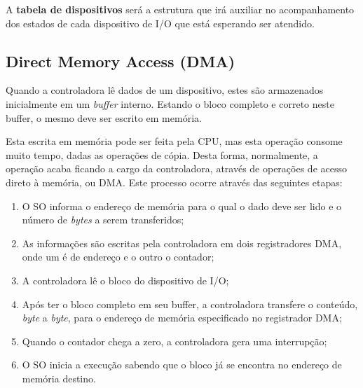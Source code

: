 A \textbf{tabela de dispositivos} será a estrutura que irá auxiliar no acompanhamento dos estados de cada dispositivo de I/O que está esperando ser atendido.






















\subsection{Direct Memory Access (DMA)}
Quando a controladora lê dados de um dispositivo, estes são armazenados inicialmente em um \textit{buffer} interno. Estando o bloco completo e correto neste buffer, o mesmo deve ser escrito em memória.

Esta escrita em memória pode ser feita pela CPU, mas esta operação consome muito tempo, dadas as operações de cópia. Desta forma, normalmente, a operação acaba ficando a cargo da controladora, através de operações de acesso direto à memória, ou DMA. Este processo ocorre através das seguintes etapas:

\begin{enumerate}
  \item O SO informa o endereço de memória para o qual o dado deve ser lido e o número de \textit{bytes} a serem transferidos;

  \item As informações são escritas pela controladora em dois registradores DMA, onde um é de endereço e o outro o contador;

  \item A controladora lê o bloco do dispositivo de I/O;

  \item Após ter o bloco completo em seu buffer, a controladora transfere o conteúdo, \textit{byte} a \textit{byte}, para o endereço de memória especificado no registrador DMA;

  \item Quando o contador chega a zero, a controladora gera uma interrupção;

  \item O SO inicia a execução sabendo que o bloco já se encontra no endereço de memória destino.

\end{enumerate}
























